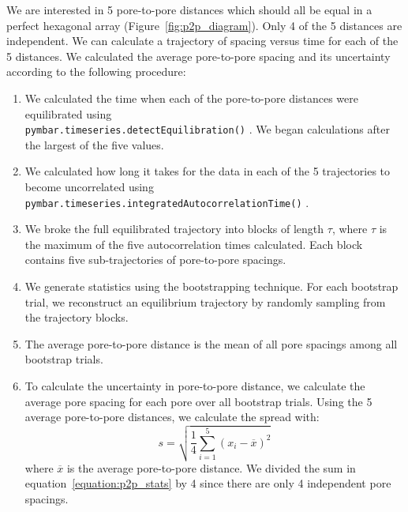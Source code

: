\documentclass[journal=jpcbfk,manusciprt=article]{achemso}
\begin{document}
  \vspace{1em} 
  We are interested in 5 pore-to-pore distances which should all be
  equal in a perfect hexagonal array (Figure~\ref{fig:p2p_diagram}). Only 4 of
  the 5 distances are independent. We can calculate a trajectory of spacing
  versus time for each of the 5 distances. We calculated the average pore-to-pore
  spacing and its uncertainty according to the following procedure:
   \begin{enumerate}
	\item We calculated the time when each of the pore-to-pore distances
	were equilibrated using \\ \texttt{pymbar.timeseries.detectEquilibration()}
	\cite{chodera_simple_2016,shirts_statistically_2008}. We began calculations
	after the largest of the five values.
	\item We calculated how long it takes for the data in each of the 5
	trajectories to become uncorrelated using \texttt{pymbar.timeseries.integratedAutocorrelationTime()}
	\cite{chodera_simple_2016,shirts_statistically_2008}. 
	\item We broke the full equilibrated trajectory into blocks of length $\tau$, where
	$\tau$ is the maximum of the five autocorrelation times calculated. Each block contains
	five sub-trajectories of pore-to-pore spacings.   
	\item We generate statistics using the bootstrapping technique. For
	each bootstrap trial, we reconstruct an equilibrium trajectory by randomly
	sampling from the trajectory blocks. 
	\item The average pore-to-pore distance is the mean of all pore
	spacings among all bootstrap trials.
	\item To calculate the uncertainty in pore-to-pore distance, we calculate the average 
	pore spacing for each pore over all bootstrap trials. Using the 5 average 
	pore-to-pore distances, we calculate the spread with:
	\begin{equation}
	s = \sqrt{\frac{1}{4} \sum_{i=1}^5 (x_i - \overline{x})^2} 
	\label{equation:p2p_stats}
	\end{equation}
	where $\overline{x}$ is the average pore-to-pore distance. We divided the sum in 
	equation~\ref{equation:p2p_stats} by 4 since there are only 4 independent pore
	spacings.
	
  \end{enumerate}
\end{document}
